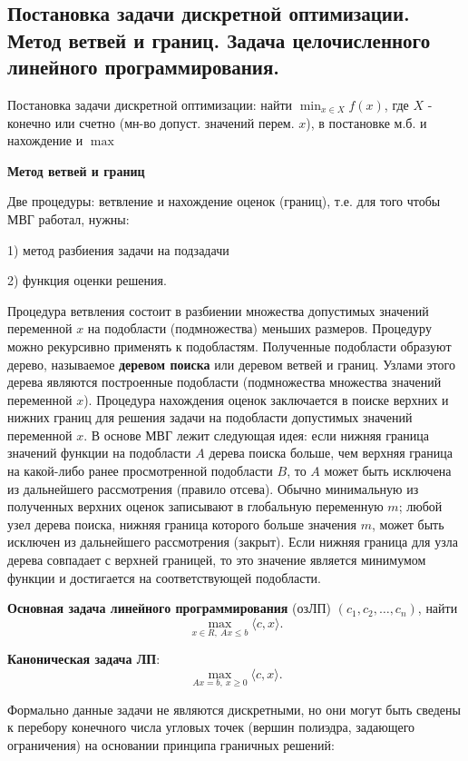 \subsection{Постановка задачи дискретной оптимизации. Метод ветвей и границ. Задача целочисленного линейного программирования.}

Постановка задачи дискретной оптимизации: найти $\min_{x \in X} f(x)$, где $X$ - конечно или счетно (мн-во допуст. значений перем. $x$), в постановке м.б. и нахождение и $\max$

\textbf{Метод ветвей и границ}

Две процедуры: ветвление и нахождение оценок (границ), т.е. для того чтобы МВГ работал, нужны: 

1) метод разбиения задачи на подзадачи 

2) функция оценки решения.

Процедура ветвления состоит в разбиении множества допустимых значений переменной $x$ на подобласти (подмножества) меньших размеров. 
Процедуру можно рекурсивно применять к подобластям. 
Полученные подобласти образуют дерево, называемое \textbf{деревом поиска} или деревом ветвей и границ. Узлами этого дерева являются построенные подобласти (подмножества множества значений переменной $x$). 
Процедура нахождения оценок заключается в поиске верхних и нижних границ для решения задачи на подобласти допустимых значений переменной $x$. В основе МВГ лежит следующая идея: если нижняя граница значений функции на подобласти $A$ дерева поиска больше, чем верхняя граница на какой-либо ранее просмотренной подобласти $B$, то $A$ может быть исключена из дальнейшего рассмотрения (правило отсева). 
Обычно минимальную из полученных верхних оценок записывают в глобальную переменную $m$; любой узел дерева поиска, нижняя граница которого больше значения $m$, может быть исключен из дальнейшего рассмотрения (закрыт). 
Если нижняя граница для узла дерева совпадает с верхней границей, то это значение является минимумом функции и достигается на соответствующей подобласти.

\textbf{Основная задача линейного программирования} (озЛП) $(c_1, c_2, \dots , c_n)$, найти 
$$\max_{x \in R,~Ax \leqslant b} \langle c, x \rangle.$$

\textbf{Каноническая задача ЛП}: 
$$\max_{Ax = b,~x \geqslant 0} \langle c, x \rangle.$$

Формально данные задачи не являются дискретными, но они могут быть сведены к перебору конечного числа угловых точек (вершин полиэдра, задающего ограничения) на основании принципа граничных решений:

